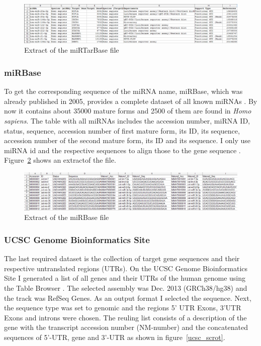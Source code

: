 \documentclass[12pt]{article}
\begin{document}
\begin{figure}[h]
\centering
\includegraphics[width=\textwidth]{results/mirtarbase_scrot.png}
\caption{Extract of the miRTarBase file}
\label{mirtarbase_scrot}
\end{figure}

\vspace{1cm}


\subsubsection{miRBase}
To get the corresponding sequence of the miRNA name, miRBase, which was already published in 2005, provides a complete dataset of all known miRNAs \cite{Griffiths-Jones}. By now it contains about 35000 mature forms and 2500 of them are found in \textit{Homo sapiens}. The table with all miRNAs includes the accession number, miRNA ID, status, sequence, accession number of first mature form, its ID, its sequence, accession number of the second mature form, its ID and its sequence. I only use miRNA id and the respective sequences to align those to the gene sequence \cite{mirbase}. Figure~\ref{mirbase_scrot} shows an extractof the file.


\begin{figure}[h]
\centering
\includegraphics[width=\textwidth]{results/mirbase.png}
\caption{Extract of the miRBase file}
\label{mirbase_scrot}
\end{figure}


\vspace{1cm}

 
\subsubsection{UCSC Genome Bioinformatics Site}
The last required dataset is the collection of target gene sequences and their respective untranslated regions (UTRs). On the UCSC Genome Bioinformatics Site I generated a list of all genes and their UTRs of the human genome using the Table Browser \cite{ucsc}. The selected assembly was Dec. 2013 (GRCh38/hg38) and the track was RefSeq Genes. As an output format I selected the sequence. Next, the sequence type was set to genomic and the regions 5' UTR Exons, 3'UTR Exons and introns were chosen. The reuling list consists of a description of the gene with the transcript accession number (NM-number) and the concatenated sequences of 5'-UTR, gene and 3'-UTR as shown in figure~\ref{ucsc_scrot}.\\
\end{document}
